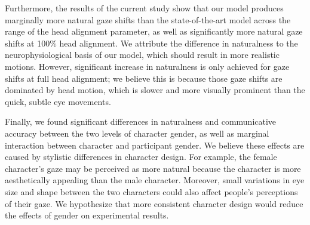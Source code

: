 Furthermore, the results of the current study show that our model produces marginally more natural gaze shifts than the state-of-the-art model across the range of the head alignment parameter, as well as significantly more natural gaze shifts at 100\% head alignment. We attribute the difference in naturalness to the neurophysiological basis of our model, which should result in more realistic motions. However, significant increase in naturalness is only achieved for gaze shifts at full head alignment; we believe this is because those gaze shifts are dominated by head motion, which is slower and more visually prominent than the quick, subtle eye movements.

Finally, we found significant differences in naturalness and communicative accuracy between the two levels of character gender, as well as marginal interaction between character and participant gender. We believe these effects are caused by stylistic differences in character design. For example, the female character's gaze may be perceived as more natural because the character is more aesthetically appealing than the male character. Moreover, small variations in eye size and shape between the two characters could also affect people's perceptions of their gaze. We hypothesize that more consistent character design would reduce the effects of gender on experimental results. 